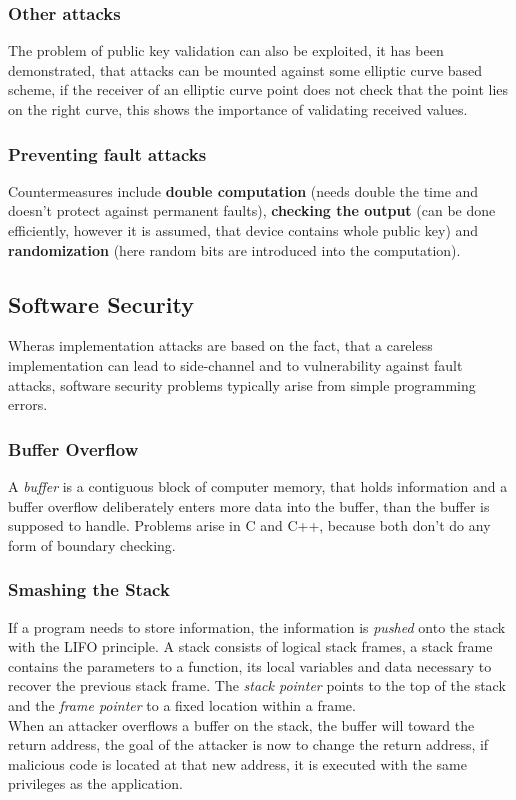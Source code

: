 \documentclass[a4paper, 10 pt, conference]{ieeeconf}
\begin{document}
\vspace{0.5cm}
\subsubsection{\textbf{Other attacks}}
The problem of public key validation can also be exploited, it has been demonstrated, that attacks can be mounted against some elliptic curve based scheme, if the receiver of an elliptic curve point does not check that the point lies on the right curve, this shows the importance of validating received values. 
\vspace{0.5cm}
\subsubsection{\textbf{Preventing fault attacks}}
\label{counterfault}
Countermeasures include \textbf{double computation} (needs double the time and doesn't protect against permanent faults), \textbf{checking the output} (can be done efficiently, however it is assumed, that device contains whole public key) and \textbf{randomization} (here random bits are introduced into the computation). 

\subsection{\textbf{Software Security}}
Wheras implementation attacks are based on the fact, that a careless implementation can lead to side-channel and to vulnerability against fault attacks, software security problems typically arise from simple programming errors. 

\vspace{0.5cm}
\subsubsection{\textbf{Buffer Overflow}}
\label{buffover}
A \emph{buffer} is a contiguous block of computer memory, that holds information and a buffer overflow deliberately enters more data into the buffer, than the buffer is supposed to handle. Problems arise in C and C++, because both don't do any form of boundary checking. 
\vspace{0.5cm}
\subsubsection{\textbf{Smashing the Stack}}
\label{smashstack}
If a program needs to store information, the information is \emph{pushed} onto the stack with the LIFO principle. 
A stack consists of logical stack frames, a stack frame contains the parameters to a function, its local variables and data necessary to recover the previous stack frame. The \emph{stack pointer} points to the top of the stack and the \emph{frame pointer} to a fixed location within a frame. \\
When an attacker overflows a buffer on the stack, the buffer will toward the return address, the goal of the attacker is now to change the return address, if malicious code is located at that new address, it is executed with the same privileges as the application. 
\vspace{0.5cm}
\end{document}
